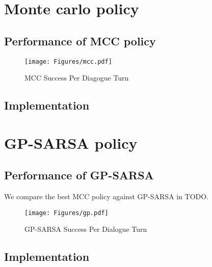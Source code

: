 \documentclass[a4paper,oneside,reqno]{amsart}
\begin{document}


\section{Monte carlo policy}

\subsection{Performance of MCC policy}

\begin{figure}[ht!]
  \begin{center}
    \texttt{[image: Figures/mcc.pdf]}
  \end{center}
  \caption{MCC Success Per Diagogue Turn}
  \label{fig:mcc}
\end{figure}

\subsection{Implementation}





\section{GP-SARSA policy}

\subsection{Performance of GP-SARSA}

We compare the best MCC policy against GP-SARSA in TODO.

\begin{figure}[ht!]
  \begin{center}
    \texttt{[image: Figures/gp.pdf]}
  \end{center}
  \caption{GP-SARSA Success Per Dialogue Turn}
  \label{fig:gp}
\end{figure}


\subsection{Implementation}


\end{document}
